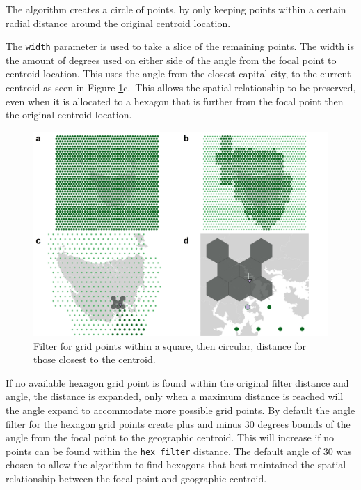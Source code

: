The algorithm creates a circle of points, by only keeping points within
a certain radial distance around the original centroid location.

The \texttt{width} parameter is used to take a slice of the remaining
points. The width is the amount of degrees used on either side of the
angle from the focal point to centroid location. This uses the angle
from the closest capital city, to the current centroid as seen in Figure
\ref{fig:filterprocess}c.~This allows the spatial relationship to be
preserved, even when it is allocated to a hexagon that is further from
the focal point then the original centroid location.

\begin{Schunk}
\begin{figure}
\includegraphics[width=0.95\linewidth]{kobakian-cook_files/figure-latex/filterprocess-1} \caption[Filter for grid points within a square, then circular, distance for those closest to the centroid]{Filter for grid points within a square, then circular, distance for those closest to the centroid.}\label{fig:filterprocess}
\end{figure}
\end{Schunk}

If no available hexagon grid point is found within the original filter
distance and angle, the distance is expanded, only when a maximum
distance is reached will the angle expand to accommodate more possible
grid points. By default the angle filter for the hexagon grid points
create plus and minus 30 degrees bounds of the angle from the focal
point to the geographic centroid. This will increase if no points can be
found within the \texttt{hex\_filter} distance. The default angle of 30
was chosen to allow the algorithm to find hexagons that best maintained
the spatial relationship between the focal point and geographic
centroid.

